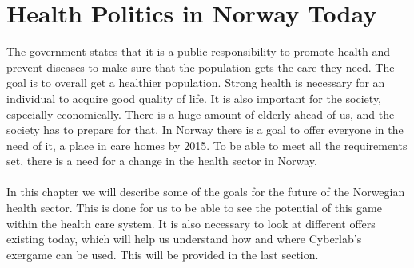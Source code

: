 \chapter{Health Politics in Norway Today}
The government states that it is a public responsibility to promote health and prevent diseases to make sure that the population gets the care they need. The goal is to overall get a healthier population. Strong health is necessary for an individual to acquire good quality of life. It is also important for the society, especially economically. There is a huge amount of elderly ahead of us, and the society has to prepare for that. In Norway there is a goal to offer everyone in the need of it, a place in care homes by 2015.  To be able to meet all the requirements set, there is a need for a change in the health sector in Norway.\\ \\
In this chapter we will describe some of the goals for the future of the Norwegian health sector. This is done for us to be able to see the potential of this game within the health care system.  It is also necessary to look at different offers existing today, which will help us understand how and where Cyberlab's exergame can be used. This will be provided in the last section. 

